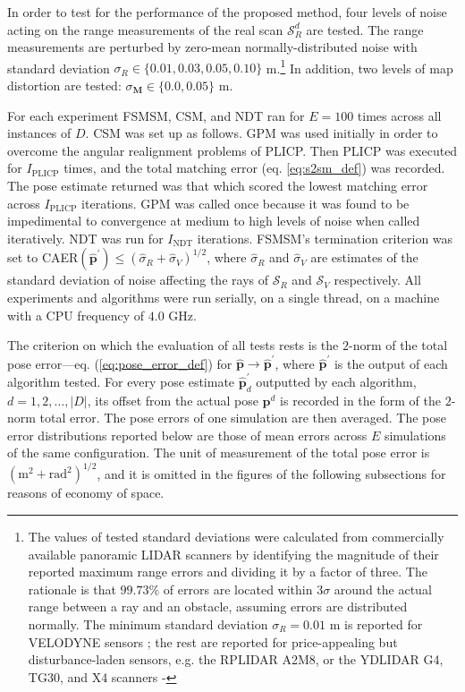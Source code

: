 In order to test for the performance of the proposed method, four
levels of noise acting on the range measurements of the real scan
$\mathcal{S}_R^d$ are tested. The range measurements are perturbed by zero-mean
normally-distributed noise with standard deviation
$\sigma_R \in \{0.01, 0.03, 0.05, 0.10\}$ m.\footnote{The values of tested
standard deviations were calculated from commercially available panoramic LIDAR
scanners by identifying the magnitude of their reported maximum range errors
and dividing it by a factor of three. The rationale is that $99.73\%$ of
errors are located within $3\sigma$ around the actual range between a ray and an
obstacle, assuming errors are distributed normally. The minimum standard
deviation $\sigma_R = 0.01$ m is reported for VELODYNE sensors
\cite{velodyne_datasheet}; the rest are reported for price-appealing but
disturbance-laden sensors, e.g. the RPLIDAR A2M8, or the YDLIDAR G4, TG30, and
X4 scanners \cite{a2m8_datasheet}-\cite{x4_datasheet}} In addition, two levels
of map distortion are tested: $\sigma_{\bm{M}} \in \{0.0, 0.05\}$ m.

For each experiment FSMSM, CSM, and NDT ran for $E = 100$ times across all
instances of $D$. CSM was set up as follows. GPM \cite{gpm} was used initially
in order to overcome the angular realignment problems \cite{plicp} of PLICP.
Then PLICP was executed for $I_{\text{PLICP}}$ times, and the total matching
error (eq. \ref{eq:s2sm_def}) was recorded. The pose estimate returned was
that which scored the lowest matching error across $I_{\text{PLICP}}$
iterations. GPM was called once because it was found to be impedimental to
convergence at medium to high levels of noise when called iteratively.
NDT was run for $I_{\text{NDT}}$ iterations. FSMSM's termination criterion was
set to CAER$(\hat{\bm{p}}^\prime) \leq (\hat{\sigma}_R + \hat{\sigma}_V)^{1/2}$,
where $\hat{\sigma}_R$ and $\hat{\sigma}_V$ are estimates of the standard
deviation of noise affecting the rays of $\mathcal{S}_R$ and $\mathcal{S}_V$
respectively. All experiments and algorithms were run serially, on a single
thread, on a machine with a CPU frequency of $4.0$ GHz.

The criterion on which the evaluation of all tests rests is the $2$-norm of the
total pose error---eq. (\ref{eq:pose_error_def}) for $\hat{\bm{p}} \rightarrow
\hat{\bm{p}}^\prime$, where $\hat{\bm{p}}^\prime$ is the output of each
algorithm tested. For every pose estimate $\hat{\bm{p}}^\prime_d$ outputted by
each algorithm, $d = 1,2,\dots,|D|$, its offset from the actual pose $\bm{p}^d$
is recorded in the form of the $2$-norm total error. The pose errors of one
simulation are then averaged. The pose error distributions reported below are
those of mean errors across $E$ simulations of the same configuration. The
unit of measurement of the total pose error is
$(\text{m}^2+\text{rad}^2)^{1/2}$, and it is omitted in the figures of the
following subsections for reasons of economy of space.

